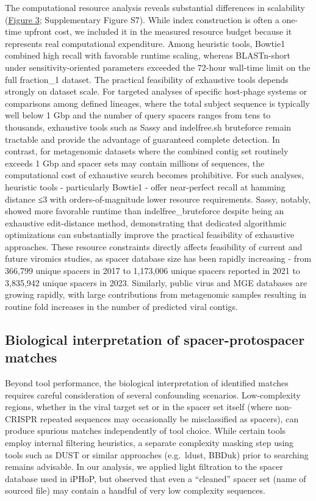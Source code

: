 \documentclass[
]{article}
\begin{document}
The computational resource analysis reveals substantial differences in
scalability (\hyperref[fig-resource-usage]{Figure 3}; Supplementary
Figure S7). While index construction is often a one-time upfront cost,
we included it in the measured resource budget because it represents
real computational expenditure. Among heuristic tools, Bowtie1 combined
high recall with favorable runtime scaling, whereas BLASTn-short under
sensitivity-oriented parameters exceeded the 72-hour wall-time limit on
the full fraction\_1 dataset. The practical feasibility of exhaustive
tools depends strongly on dataset scale. For targeted analyses of
specific host-phage systems or comparisons among defined lineages, where
the total subject sequence is typically well below 1 Gbp and the number
of query spacers ranges from tens to thousands, exhaustive tools such as
Sassy and indelfree.sh bruteforce remain tractable and provide the
advantage of guaranteed complete detection. In contrast, for metagenomic
datasets where the combined contig set routinely exceeds 1 Gbp and
spacer sets may contain millions of sequences, the computational cost of
exhaustive search becomes prohibitive. For such analyses, heuristic
tools - particularly Bowtie1 - offer near-perfect recall at hamming
distance ≤3 with orders-of-magnitude lower resource requirements. Sassy,
notably, showed more favorable runtime than indelfree\_bruteforce
despite being an exhaustive edit-distance method, demonstrating that
dedicated algorithmic optimizations can substantially improve the
practical feasibility of exhaustive approaches. These resource
constraints directly affects feasibility of current and future viromics
studies, as spacer database size has been rapidly increasing - from
366,799 unique spacers in 2017\autocite{Shmakov_2017} to 1,173,006
unique spacers reported in 2021\autocite{Dion_2021} to 3,835,942 unique
spacers in 2023\autocite{camargo_img_vr4_2023}. Similarly, public virus
and MGE databases are growing rapidly, with large contributions from
metagenomic samples resulting in routine fold increases in the number of
predicted viral contigs\autocite{camargo_img_vr4_2023}.

\subsection{Biological interpretation of spacer-protospacer
matches}\label{sec-biological-interpretation}

Beyond tool performance, the biological interpretation of identified
matches requires careful consideration of several confounding scenarios.
Low-complexity regions, whether in the viral target set or in the spacer
set itself (where non-CRISPR repeated sequences may occasionally be
misclassified as spacers), can produce spurious matches independently of
tool choice. While certain tools employ internal filtering heuristics, a
separate complexity masking step using tools such as
DUST\autocite{Morgulis_2006} or similar approaches (e.g.~ldust, BBDuk)
prior to searching remains advisable. In our analysis, we applied light
filtration to the spacer database used in iPHoP, but observed that even
a ``cleaned'' spacer set (name of sourced file) may contain a handful of
very low complexity sequences.
\end{document}
